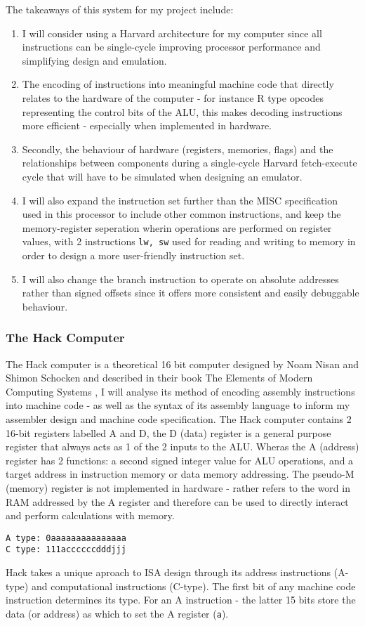 \bigskip

The takeaways of this system for my project include:
\begin{enumerate}
    \item I will consider using a Harvard architecture for my computer since all instructions can be single-cycle improving processor performance and simplifying design and emulation.
    \item The encoding of instructions into meaningful machine code that directly relates to the hardware of the computer - for instance R type opcodes representing the control bits of the ALU, this makes decoding instructions more efficient - especially when implemented in hardware.
    \item Secondly, the behaviour of hardware (registers, memories, flags) and the relationships between components during a single-cycle Harvard fetch-execute cycle that will have to be simulated when designing an emulator.
    \item I will also expand the instruction set further than the MISC specification used in this processor to include other common instructions, and keep the memory-register seperation wherin operations are performed on register values, with 2 instructions \texttt{lw, sw} used for reading and writing to memory in order to design a more user-friendly instruction set.
    \item I will also change the branch instruction to operate on absolute addresses rather than signed offsets since it offers more consistent and easily debuggable behaviour.
\end{enumerate}

\subsubsection{The Hack Computer}
The Hack computer is a theoretical 16 bit computer designed by Noam Nisan and Shimon Schocken and described in their book The Elements of Modern Computing Systems \textcite{EOCS}, I will analyse its method of encoding assembly instructions into machine code - as well as the syntax of its assembly language to inform my assembler design and machine code specification. The Hack computer contains 2 16-bit registers labelled A and D, the D (data) register is a general purpose register that always acts as 1 of the 2 inputs to the ALU. Wheras the A (address) register has 2 functions: a second signed integer value for ALU operations, and a target address in instruction memory or data memory addressing. The pseudo-M (memory) register is not implemented in hardware - rather refers to the word in RAM addressed by the A register and therefore can be used to directly interact and perform calculations with memory.
\begin{lstlisting}
A type: 0aaaaaaaaaaaaaaa
C type: 111accccccdddjjj
\end{lstlisting} 
Hack takes a unique aproach to ISA design through its address instructions (A-type) and computational instructions (C-type). The first bit of any machine code instruction determines its type. For an A instruction - the latter 15 bits store the data (or address) as which to set the A register (\texttt{a}). 

